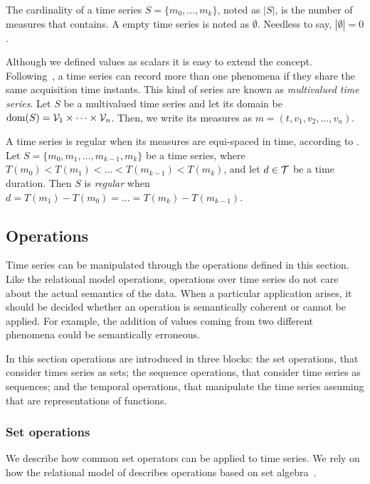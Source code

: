 The cardinality of a time series $S=\{m_0,\dots,m_k\}$, noted as
$|S|$, is the number of measures that contains.  A empty time series is
noted as $\emptyset$. Needless to say, $|\emptyset|=0$.

Although we defined values as scalars it is easy to extend the
concept. Following~\cite{assfalg08:thesis}, a time series can record
more than one phenomena if they share the same acquisition time
instants.  This kind of series are known as \emph{multivalued time
  series}. Let $S$ be a multivalued time series and let its domain be
$\operatorname{dom}(S)={\cal{V}}_1\times\cdots\times{\cal{V}}_n$. Then, we write its
measures as $m=(t,v_1,v_2,\ldots,v_n)$.



A time series is regular when its measures are equi-spaced in time,
according to \cite{last:hetland}.  Let $S=\{m_0, m_1,\ldots,
m_{k-1},m_k\}$ be a time series, where
$T(m_0)<T(m_1)<\dots<T(m_{k-1})<T(m_k)$, and let $d\in\cal{T}$ be a
time duration. Then $S$ is \emph{regular} when $d=T(m_1)-T(m_0)=
\dots =T(m_k)-T(m_{k-1})$.




\subsection{Operations}
\label{sec:model:operations}

Time series can be manipulated through the operations defined in this
section.
%
Like the relational model operations, operations over time series do
not care about the actual semantics of the data. When a particular
application arises, it should be decided whether an operation is
semantically coherent or cannot be applied. For example, the addition
of values coming from two different phenomena could be semantically
erroneous.

In this section operations are introduced in three blocks: the set
operations, that consider times series as sets; the sequence
operations, that consider time series as sequences; and the temporal
operations, that manipulate the time series assuming that are
representations of functions. 



\subsubsection{Set operations}

We describe how common set operators can be applied to time series. We
rely on how the relational model of  describes operations
based on set algebra~\cite{date:introduction}.

